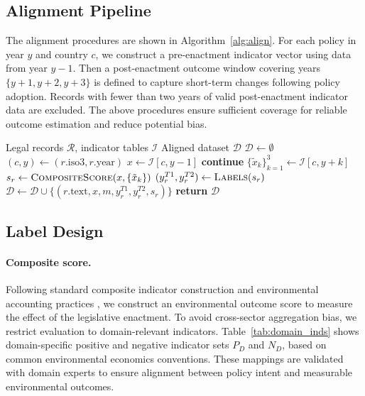 \documentclass[11pt]{article}
\begin{document}
\subsection{Alignment Pipeline}
\label{sec:pipeline}


The alignment procedures are shown in Algorithm~\ref{alg:align}. For each policy in year $y$ and country $c$, we construct a pre-enactment indicator vector using data from year $y-1$. Then a post-enactment outcome window covering years $\{y+1, y+2, y+3\}$ is defined to capture short-term changes following policy adoption. Records with fewer than two years of valid post-enactment indicator data are excluded. The above procedures ensure sufficient coverage for reliable outcome estimation and reduce potential bias.

\begin{algorithm}[t]
\small
\caption{Policy–Outcome Alignment}
\label{alg:align}
\begin{algorithmic}[1]
\Require Legal records $\mathcal{R}$, indicator tables $\mathcal{I}$
\Ensure Aligned dataset $\mathcal{D}$
\State $\mathcal{D}\gets\emptyset$
    \State $(c,y)\gets(r.\text{iso3}, r.\text{year})$
    \State $x\gets \mathcal{I}[c, y-1]$ 
    \State \textbf{continue}
    \EndIf
    \State $\{\tilde{x}_k\}_{k=1}^{3}\gets \mathcal{I}[c, y+k]$
    \State $s_r \gets \textsc{CompositeScore}(x, \{\tilde{x}_k\})$
    \State $(y^{T1}_r, y^{T2}_r)\gets\textsc{Labels}(s_r)$
    \State $\mathcal{D}\gets\mathcal{D}\cup\{(r.\text{text}, x, m, y^{T1}_r, y^{T2}_r, s_r)\}$
\EndFor
\State \textbf{return} $\mathcal{D}$
\end{algorithmic}
\end{algorithm}

\subsection{Label Design}
\label{sec:labels}

\paragraph{Composite score.}
Following standard composite indicator construction and environmental accounting practices \citep{joint2008handbook}, we construct an environmental outcome score to measure the effect of the legislative enactment. To avoid cross-sector aggregation bias, we restrict evaluation to domain-relevant indicators. Table~\ref{tab:domain_inds} shows domain-specific positive and negative indicator sets $P_D$ and $N_D$, based on common environmental economics conventions.  These mappings are validated with domain experts to ensure alignment between policy intent and measurable environmental outcomes.
\end{document}
